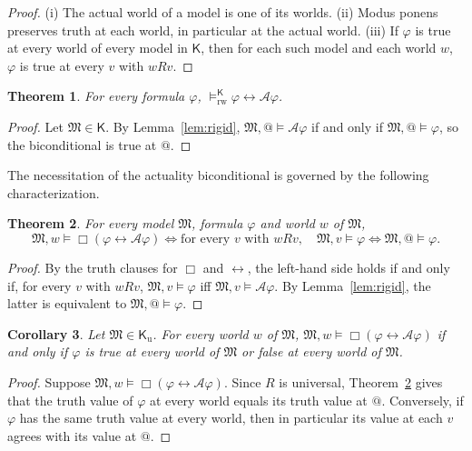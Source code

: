 \documentclass[11pt]{amsart}
\makeatletter
\theoremstyle{plain}
\newtheorem{theorem}{Theorem}[section]
\newtheorem{corollary}[theorem]{Corollary}
\theoremstyle{definition}
\theoremstyle{remark}
\newcommand{\Act}{\mathcal{A}}
\newcommand{\Mod}{\mathfrak{M}}
\newcommand{\Kl}{\mathsf{K}}
\newcommand{\at}{@}
\newcommand{\RWv}[1]{\models^{#1}_{\mathrm{rw}}}
\makeatother
\begin{document}
\begin{proof}
(i) The actual world of a model is one of its worlds. (ii) Modus ponens
preserves truth at each world, in particular at the actual world.
(iii) If $\varphi$ is true at every world of every model in $\Kl$, then
for each such model and each world $w$, $\varphi$ is true at every $v$
with $wRv$.
\end{proof}

\begin{theorem}
\label{thm:rw}
For every formula $\varphi$,
$\RWv{\Kl} \varphi \leftrightarrow \Act\varphi$.
\end{theorem}

\begin{proof}
Let $\Mod \in \Kl$. By Lemma~\ref{lem:rigid},
$\Mod, \at \models \Act\varphi$ if and only if
$\Mod, \at \models \varphi$, so the biconditional is true at $\at$.
\end{proof}

The necessitation of the actuality biconditional is governed by the
following characterization.

\begin{theorem}
\label{thm:characterization}
For every model $\Mod$, formula $\varphi$ and world $w$ of $\Mod$,
\[
  \Mod, w \models \Box(\varphi \leftrightarrow \Act\varphi)
  \iff
  \text{for every } v \text{ with } wRv,\quad
  \Mod, v \models \varphi \iff \Mod, \at \models \varphi .
\]
\end{theorem}

\begin{proof}
By the truth clauses for $\Box$ and $\leftrightarrow$, the left-hand
side holds if and only if, for every $v$ with $wRv$,
$\Mod, v \models \varphi$ iff $\Mod, v \models \Act\varphi$. By
Lemma~\ref{lem:rigid}, the latter is equivalent to
$\Mod, \at \models \varphi$.
\end{proof}

\begin{corollary}
\label{cor:universal}
Let $\Mod \in \Kl_{\mathrm{u}}$. For every world $w$ of $\Mod$,
$\Mod, w \models \Box(\varphi \leftrightarrow \Act\varphi)$ if and only
if $\varphi$ is true at every world of $\Mod$ or false at every world
of $\Mod$.
\end{corollary}

\begin{proof}
Suppose $\Mod, w \models \Box(\varphi \leftrightarrow \Act\varphi)$.
Since $R$ is universal, Theorem~\ref{thm:characterization} gives that
the truth value of $\varphi$ at every world equals its truth value at
$\at$. Conversely, if $\varphi$ has the same truth value at every
world, then in particular its value at each $v$ agrees with its value
at $\at$.
\end{proof}
\end{document}
